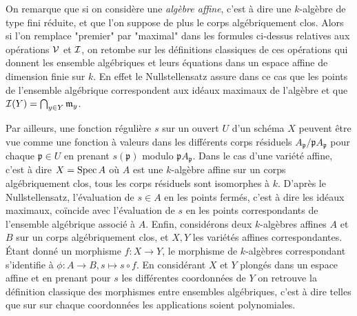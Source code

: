 \begin{rem}
On remarque que si on considère une \textit{algèbre affine}, c'est à dire une $k$-algèbre de type fini réduite, et que l'on suppose de plus le corps algébriquement clos. Alors si l'on remplace "premier" par "maximal" dans les formules ci-dessus relatives aux opérations $\mathcal{V}$ et $\mathcal{I}$, on retombe sur les définitions classiques de ces opérations qui donnent les ensemble algébriques et leurs équations dans un espace affine de dimension finie sur $k$. En effet le Nullstellensatz assure dans ce cas que les points de l'ensemble algébrique correspondent aux idéaux maximaux de l'algèbre et que $\mathcal{I}(Y)=\bigcap_{y\in Y}\mathfrak{m}_y$.

Par ailleurs, une fonction régulière $s$ sur un ouvert $U$ d'un schéma $X$ peuvent être vue comme une fonction à valeurs dans les différents corps résiduels $A_\mathfrak{p}/\mathfrak{p}A_\mathfrak{p}$ pour chaque $\mathfrak{p}\in U$ en prenant $s(\mathfrak{p})$ modulo $\mathfrak{p}A_\mathfrak{p}$. Dans le cas d'une variété affine, c'est à dire $X=\operatorname{Spec} A$ où $A$ est une $k$-algèbre affine sur un corps algébriquement clos, tous les corps résiduels sont isomorphes à $k$. D'après le Nullstellensatz, l'évaluation de $s\in A$ en les points fermés, c'est à dire les idéaux maximaux, coïncide avec l'évaluation de $s$ en les points correspondants de l'ensemble algébrique associé à $A$. Enfin, considérons deux $k$-algèbres affines $A$ et $B$ sur un corps algébriquement clos, et $X, Y$ les variétés affines correspondantes. Étant donné un morphisme $f:X\rightarrow Y$, le morphisme de $k$-algèbres correspondant s'identifie à $\phi:A\rightarrow B,s\mapsto s\circ f$. En considérant $X$ et $Y$ plongés dans un espace affine et en prenant pour $s$ les différentes coordonnées de $Y$ on retrouve la définition classique des morphismes entre ensembles algébriques, c'est à dire telles que sur sur chaque coordonnées les applications soient polynomiales.
\end{rem}


